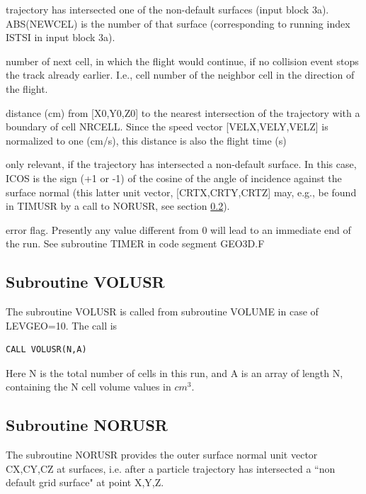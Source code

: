 \begin{list}{ }{}
\item[{\bf NEWCEL }]
\begin{list}{ }{}
\item[{\bf $< 0 $}]
trajectory has intersected one of the non-default surfaces (input block 3a).
ABS(NEWCEL) is the number of that surface (corresponding to running index
ISTSI in input block 3a).
\item[{\bf $> 0$ }]
number of next cell, in which the flight would continue, if no collision event
stops the track already earlier. I.e., cell number of the neighbor cell in the direction
of the flight.
\end{list}
\item[{\bf TIM }]
distance (cm) from [X0,Y0,Z0]
to the nearest intersection of the trajectory with a
boundary of cell NRCELL.  Since the speed vector [VELX,VELY,VELZ] is normalized to one (cm/s),
this distance is also the flight time (s)
\item[{\bf ICOS }]
only relevant, if the trajectory has intersected a non-default surface.
In this case, ICOS is the sign (+1 or -1) of the cosine of the angle of
incidence against the surface normal (this latter unit vector, [CRTX,CRTY,CRTZ]
may, e.g., be found in TIMUSR by a call
to NORUSR, see section \ref{sec3.8.4}).
\item[{\bf IERR }]
error flag. Presently
any value different from 0 will lead to an immediate end of the run.
See subroutine TIMER in code segment GEO3D.F


\end{list}
\subsection{Subroutine VOLUSR}
\label{sec3.8.3} The subroutine VOLUSR is called from subroutine
VOLUME in case of LEVGEO=10. The call is
\begin{verbatim}
CALL VOLUSR(N,A)
\end{verbatim}
Here N is the total number of cells in this run, and
A is an array of length N, containing the N cell volume values in $cm^3$.
\subsection{Subroutine NORUSR}
\label{sec3.8.4} The subroutine NORUSR provides the outer surface normal unit vector CX,CY,CZ at surfaces,
i.e. after a particle trajectory has intersected a ``non default grid surface" at point X,Y,Z.

